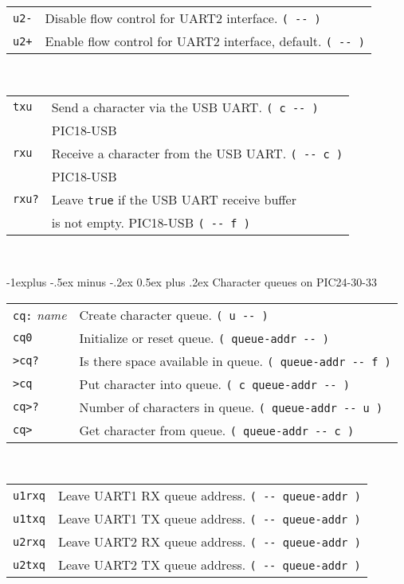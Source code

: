 \documentclass[10pt,landscape,a4paper]{article}
\makeatletter
\renewcommand{\subsection}{\@startsection{subsection}{2}{0mm}%
                                {-1explus -.5ex minus -.2ex}%
                                {0.5ex plus .2ex}%
                                {\normalfont\normalsize\bfseries}}
\makeatother
\begin{document}
\begin{multicols}{3}
\begin{tabular}{@{}ll@{}}
\verb!u2-!  & Disable flow control for UART2 interface. \verb!( -- )! \\
\verb!u2+!  & Enable flow control for UART2 interface, default. \verb!( -- )! \\
\end{tabular}\\
\begin{tabular}{@{}ll@{}}
\verb!txu!  & Send a character via the USB UART. \verb!( c -- )! \\
            & PIC18-USB \\
\verb!rxu!  & Receive a character from the USB UART. \verb!( -- c )! \\
            & PIC18-USB \\
\verb!rxu?!  & Leave \verb!true! if the USB UART receive buffer \\
             & is not empty. PIC18-USB \verb!( -- f )! \\
\end{tabular}\\

\medskip

\subsection{Character queues on PIC24-30-33}
\begin{tabular}{@{}ll@{}}
\verb!cq:! \textit{name} & Create character queue. \verb!( u -- )! \\
\verb!cq0! & Initialize or reset queue. \verb!( queue-addr -- )! \\
\verb!>cq?! & Is there space available in queue. \verb!( queue-addr -- f )! \\
\verb!>cq! & Put character into queue. \verb!( c queue-addr -- )! \\
\verb!cq>?! & Number of characters in queue. \verb!( queue-addr -- u )! \\
\verb!cq>! & Get character from queue. \verb!( queue-addr -- c )! \\
\end{tabular}\\
\begin{tabular}{@{}ll@{}}
\verb!u1rxq! & Leave UART1 RX queue address. \verb!( -- queue-addr )! \\
\verb!u1txq! & Leave UART1 TX queue address. \verb!( -- queue-addr )! \\
\verb!u2rxq! & Leave UART2 RX queue address. \verb!( -- queue-addr )! \\
\verb!u2txq! & Leave UART2 TX queue address. \verb!( -- queue-addr )! \\
\end{tabular}\\


\end{multicols}
\end{document}
